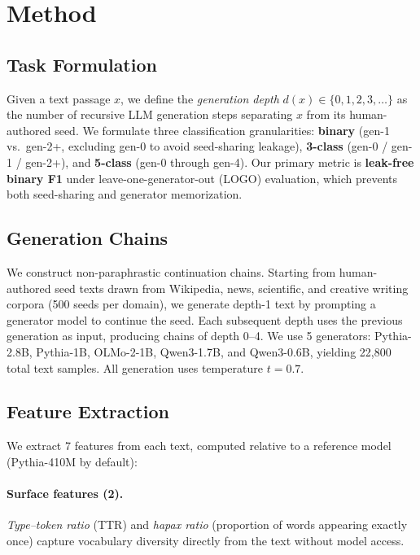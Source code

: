 \documentclass[11pt,a4paper]{article}
\begin{document}
\section{Method}

\subsection{Task Formulation}

Given a text passage $x$, we define the \emph{generation depth} $d(x) \in \{0, 1, 2, 3, \ldots\}$ as the number of recursive LLM generation steps separating $x$ from its human-authored seed.
We formulate three classification granularities:
\textbf{binary} (gen-1 vs.\ gen-2+, excluding gen-0 to avoid seed-sharing leakage),
\textbf{3-class} (gen-0 / gen-1 / gen-2+), and
\textbf{5-class} (gen-0 through gen-4).
Our primary metric is \textbf{leak-free binary F1} under leave-one-generator-out (LOGO) evaluation, which prevents both seed-sharing and generator memorization.

\subsection{Generation Chains}

We construct non-paraphrastic continuation chains.
Starting from human-authored seed texts drawn from Wikipedia, news, scientific, and creative writing corpora (500 seeds per domain), we generate depth-1 text by prompting a generator model to continue the seed.
Each subsequent depth uses the previous generation as input, producing chains of depth 0--4.
We use 5 generators: Pythia-2.8B, Pythia-1B, OLMo-2-1B, Qwen3-1.7B, and Qwen3-0.6B, yielding 22,800 total text samples.
All generation uses temperature $t = 0.7$.

\subsection{Feature Extraction}

We extract 7 features from each text, computed relative to a reference model (Pythia-410M by default):

\paragraph{Surface features (2).}
\emph{Type--token ratio} (TTR) and \emph{hapax ratio} (proportion of words appearing exactly once) capture vocabulary diversity directly from the text without model access.
\end{document}
